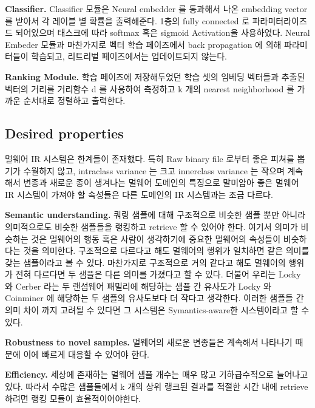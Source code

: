 \textbf{Classifier. }
Classifier 모듈은 Neural embedder 를 통과해서 나온 embedding vector 를 받아서 각 레이블 별 확률을 출력해준다. 1층의 fully connected 로 파라미터라이즈드 되어있으며 태스크에 따라 softmax 혹은 sigmoid Activation을 사용하였다. Neural Embeder 모듈과 마찬가지로 벡터 학습 페이즈에서 back propagation 에 의해 파라미터들이 학습되고, 리트리벌 페이즈에서는 업데이트되지 않는다. 

\textbf{Ranking Module. }
학습 페이즈에 저장해두었던 학습 셋의 임베딩 벡터들과 추출된 벡터의 거리를 거리함수 d 를 사용하여 측정하고 k 개의 nearest neighborhood 를 가까운 순서대로 정렬하고 출력한다.


\subsection{Desired properties}
멀웨어 IR 시스템은 한계들이 존재했다. 특히 Raw binary file 로부터 좋은 피쳐를 뽑기가 수월하지 않고, intraclass variance 는 크고 innerclass variance 는 작으며 계속해서 변종과 새로운 종이 생겨나는 멀웨어 도메인의 특징으로 말미암아 좋은 멀웨어 IR 시스템이 가져야 할 속성들은 다른 도메인의 IR 시스템과는 조금 다르다.

\textbf{Semantic understanding. }
쿼링 샘플에 대해 구조적으로 비슷한 샘플 뿐만 아니라 의미적으로도 비슷한 샘플들을 랭킹하고 retrieve 할 수 있어야 한다. 여기서 의미가 비슷하는 것은 멀웨어의 행동 혹은 사람이 생각하기에 중요한 멀웨어의 속성들이 비슷하다는 것을 의미한다. 구조적으로 다르다고 해도 멀웨어의 행위가 일치하면 같은 의미를 갖는 샘플이라고 볼 수 있다. 마찬가지로 구조적으로 거의 같다고 해도 멀웨어의 행위가 전혀 다르다면 두 샘플은 다른 의미를 가졌다고 할 수 있다. 더불어 우리는 Locky 와 Cerber 라는 두 랜섬웨어 패밀리에 해당하는 샘플 간 유사도가 Locky 와 Coinminer 에 해당하는 두 샘플의 유사도보다 더 작다고 생각한다. 이러한 샘플들 간 의미 차이 까지 고려될 수 있다면 그 시스템은 Symantics-aware한 시스템이라고 할 수 있다. 
 
\textbf{Robustness to novel samples. }
멀웨어의 새로운 변종들은 계속해서 나타나기 때문에 이에 빠르게 대응할 수 있어야 한다. 
%


\textbf{Efficiency. }
세상에 존재하는 멀웨어 샘플 개수는 매우 많고 기하급수적으로 늘어나고 있다. 따라서 수많은 샘플들에서 k 개의 상위 랭크된 결과를 적절한 시간 내에 retrieve 하려면 랭킹 모듈이 효율적이어야한다.



